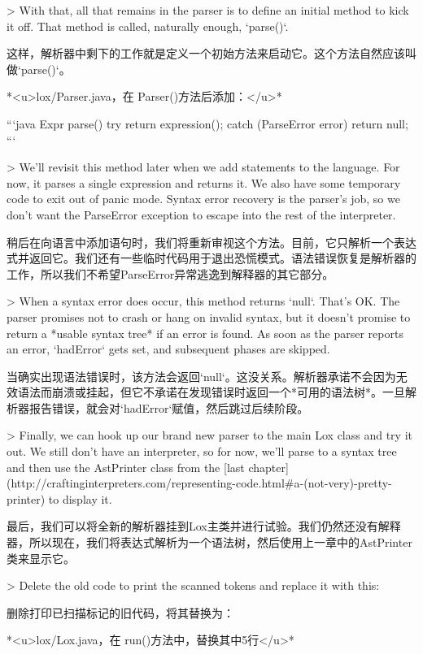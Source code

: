 \documentclass[cn,11pt,chinese]{elegantbook}
\begin{document}
> With that, all that remains in the parser is to define an initial method to kick it off. That method is called, naturally enough, `parse()`.

这样，解析器中剩下的工作就是定义一个初始方法来启动它。这个方法自然应该叫做`parse()`。

*<u>lox/Parser.java，在 Parser()方法后添加：</u>*

```java
  Expr parse() {
    try {
      return expression();
    } catch (ParseError error) {
      return null;
    }
  }
```

> We’ll revisit this method later when we add statements to the language. For now, it parses a single expression and returns it. We also have some temporary code to exit out of panic mode. Syntax error recovery is the parser’s job, so we don’t want the ParseError exception to escape into the rest of the interpreter.

稍后在向语言中添加语句时，我们将重新审视这个方法。目前，它只解析一个表达式并返回它。我们还有一些临时代码用于退出恐慌模式。语法错误恢复是解析器的工作，所以我们不希望ParseError异常逃逸到解释器的其它部分。

> When a syntax error does occur, this method returns `null`. That’s OK. The parser promises not to crash or hang on invalid syntax, but it doesn’t promise to return a *usable syntax tree* if an error is found. As soon as the parser reports an error, `hadError` gets set, and subsequent phases are skipped.

当确实出现语法错误时，该方法会返回`null`。这没关系。解析器承诺不会因为无效语法而崩溃或挂起，但它不承诺在发现错误时返回一个*可用的语法树*。一旦解析器报告错误，就会对`hadError`赋值，然后跳过后续阶段。

> Finally, we can hook up our brand new parser to the main Lox class and try it out. We still don’t have an interpreter, so for now, we’ll parse to a syntax tree and then use the AstPrinter class from the [last chapter](http://craftinginterpreters.com/representing-code.html#a-(not-very)-pretty-printer) to display it.

最后，我们可以将全新的解析器挂到Lox主类并进行试验。我们仍然还没有解释器，所以现在，我们将表达式解析为一个语法树，然后使用上一章中的AstPrinter类来显示它。

> Delete the old code to print the scanned tokens and replace it with this:

删除打印已扫描标记的旧代码，将其替换为：

*<u>lox/Lox.java，在 run()方法中，替换其中5行</u>*
\end{document}
